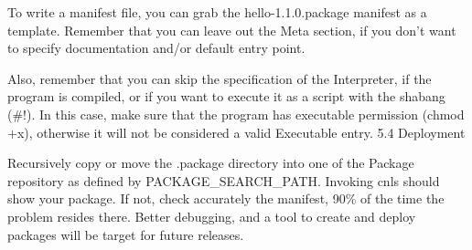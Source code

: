 To write a manifest file, you can grab the hello-1.1.0.package manifest as a template. Remember that you can leave out the Meta section, if you don’t want to specify documentation and/or default entry point.

Also, remember that you can skip the specification of the Interpreter, if the
program is compiled, or if you want to execute it as a script with the shabang
(\#!). In this case, make sure that the program has executable permission (chmod
+x), otherwise it will not be considered a valid Executable entry.  5.4
Deployment

Recursively copy or move the .package directory into one of the Package
repository as defined by PACKAGE\_SEARCH\_PATH. Invoking cnls should show your
package. If not, check accurately the manifest, 90\% of the time the problem
resides there. Better debugging, and a tool to create and deploy packages will
be target for future releases.





